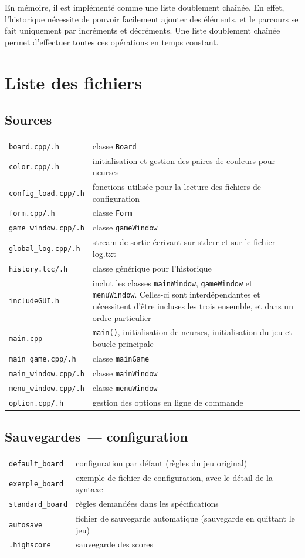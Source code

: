 \documentclass[11pt,a4paper]{article}
\begin{document}
En mémoire, il est implémenté comme une liste doublement chaînée. En effet, l'historique nécessite de pouvoir facilement ajouter des éléments, et le parcours se fait uniquement par incréments et décréments. Une liste doublement chaînée permet d'effectuer toutes ces opérations en temps constant.


\clearpage
\appendix

\section{Liste des fichiers}
\subsection*{Sources}
\begin{tabular}{lp{76mm}}
\verb"board.cpp/.h" & classe \verb"Board" \\
\verb"color.cpp/.h" & initialisation et gestion des paires de couleurs pour ncurses \\
\verb"config_load.cpp/.h" & fonctions utilisée pour la lecture des fichiers de configuration \\
\verb"form.cpp/.h" & classe \verb"Form" \\
\verb"game_window.cpp/.h" & classe \verb"gameWindow" \\
\verb"global_log.cpp/.h" & stream de sortie écrivant sur stderr et sur le fichier log.txt \\
\verb"history.tcc/.h" & classe générique pour l'historique \\
\verb"includeGUI.h" & inclut les classes \verb"mainWindow", \verb"gameWindow" et \verb"menuWindow". Celles-ci sont interdépendantes et nécessitent d'être incluses les trois ensemble, et dans un ordre particulier \\
\verb"main.cpp" & \verb"main()", initialisation de ncurses, initialisation du jeu et boucle principale \\
\verb"main_game.cpp/.h" & classe \verb"mainGame" \\
\verb"main_window.cpp/.h" & classe \verb"mainWindow" \\
\verb"menu_window.cpp/.h" & classe \verb"menuWindow" \\
\verb"option.cpp/.h" & gestion des options en ligne de commande \\
\end{tabular}

\subsection*{Sauvegardes~--- configuration}
\begin{tabular}{lp{84mm}}
\verb"default_board" & configuration par défaut (règles du jeu original) \\
\verb"exemple_board" & exemple de fichier de configuration, avec le détail de la syntaxe \\
\verb"standard_board" & règles demandées dans les spécifications \\
\verb"autosave" & fichier de sauvegarde automatique (sauvegarde en quittant le jeu) \\
\verb".highscore" & sauvegarde des scores \\
\end{tabular}
\end{document}

